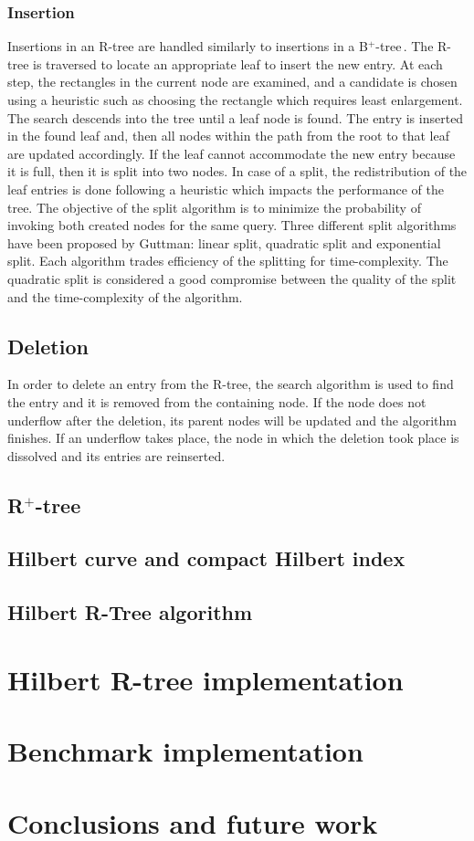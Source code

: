 \documentclass[11pt, a4paper, oneside]{article}
\newcommand{\rplus}{R$^+$-tree$\,$}
\newcommand{\bplus}{B$^+$-tree$\,$}
\begin{document}
\subsubsection*{Insertion}
Insertions in an R-tree are handled similarly to insertions in a \bplus. The R-tree is traversed to locate an appropriate leaf to insert the new entry. At each step, the rectangles in the current node are examined, and a candidate is chosen using a heuristic such as choosing the rectangle which requires least enlargement. The search descends into the tree until a leaf node is found.
The entry is inserted in the found leaf and, then all nodes within the path from the root to that leaf are updated accordingly. If the leaf cannot accommodate the new entry because it is full, then it is split into two nodes. In case of a split, the redistribution of the leaf entries is done following a heuristic which impacts the performance of the tree. The objective of the split algorithm is to minimize the probability of invoking both created nodes for the same query. Three different split algorithms have been proposed by Guttman: linear split, quadratic split and exponential split. Each algorithm trades efficiency of the splitting for time-complexity. The quadratic split is considered a good compromise between the quality of the split and the time-complexity of the algorithm.

\subsection*{Deletion}
In order to delete an entry from the R-tree, the search algorithm is used to find the entry and it is removed from the containing node. If the node does not underflow after the deletion, its parent nodes will be updated and the algorithm finishes. If an underflow takes place, the node in which the deletion took place is dissolved and its entries are reinserted.

\subsection{\rplus}
\subsection{Hilbert curve and compact Hilbert index}
\subsection{Hilbert R-Tree algorithm}

\section{Hilbert R-tree implementation}
\label{hrtree}

\section{Benchmark implementation}
\label{benchmark}

\section{Conclusions and future work}

\newpage


\newpage
\end{document}
